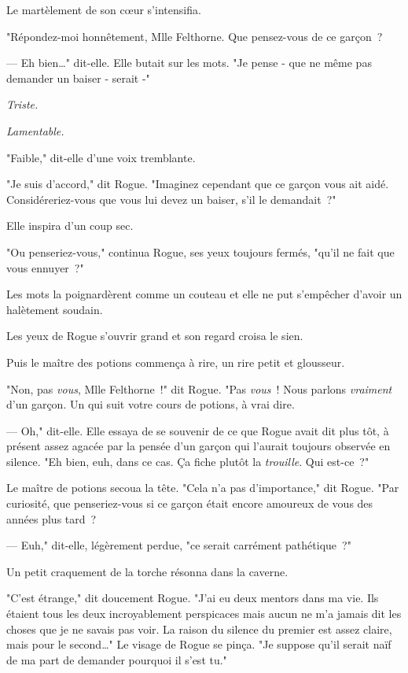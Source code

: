 Le martèlement de son cœur s'intensifia.

"Répondez-moi honnêtement, Mlle Felthorne. Que pensez-vous de ce garçon~?

--- Eh bien…" dit-elle. Elle butait sur les mots. "Je pense - que ne même pas demander un baiser - serait -"

\emph{Triste.}

\emph{Lamentable.}

"Faible," dit-elle d'une voix tremblante.

"Je suis d'accord," dit Rogue. "Imaginez cependant que ce garçon vous ait aidé. Considéreriez-vous que vous lui devez un baiser, s'il le demandait~?"

Elle inspira d'un coup sec.

"Ou penseriez-vous," continua Rogue, ses yeux toujours fermés, "qu'il ne fait que vous ennuyer~?"

Les mots la poignardèrent comme un couteau et elle ne put s'empêcher d'avoir un halètement soudain.

Les yeux de Rogue s'ouvrir grand et son regard croisa le sien.

Puis le maître des potions commença à rire, un rire petit et glousseur.

"Non, pas \emph{vous}, Mlle Felthorne~!" dit Rogue. "Pas \emph{vous}~! Nous parlons \emph{vraiment} d'un garçon. Un qui suit votre cours de potions, à vrai dire.

--- Oh," dit-elle. Elle essaya de se souvenir de ce que Rogue avait dit plus tôt, à présent assez agacée par la pensée d'un garçon qui l'aurait toujours observée en silence. "Eh bien, euh, dans ce cas. Ça fiche plutôt la \emph{trouille}. Qui est-ce~?"

Le maître de potions secoua la tête. "Cela n'a pas d'importance," dit Rogue. "Par curiosité, que penseriez-vous si ce garçon était encore amoureux de vous des années plus tard~?

--- Euh," dit-elle, légèrement perdue, "ce serait carrément pathétique~?"

Un petit craquement de la torche résonna dans la caverne.

"C'est étrange," dit doucement Rogue. "J'ai eu deux mentors dans ma vie. Ils étaient tous les deux incroyablement perspicaces mais aucun ne m'a jamais dit les choses que je ne savais pas voir. La raison du silence du premier est assez claire, mais pour le second…" Le visage de Rogue se pinça. "Je suppose qu'il serait naïf de ma part de demander pourquoi il s'est tu."

